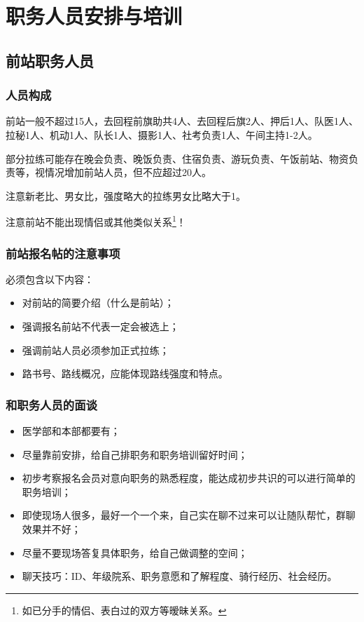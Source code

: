\documentclass[UTF8]{ctexart}
\begin{document}
\section{职务人员安排与培训}

\subsection{前站职务人员}

\subsubsection{人员构成}

前站一般不超过15人，去回程前旗助共4人、去回程后旗2人、押后1人、队医1人、拉秘1人、机动1人、队长1人、摄影1人、社考负责1人、午间主持1-2人。

部分拉练可能存在晚会负责、晚饭负责、住宿负责、游玩负责、午饭前站、物资负责等，视情况增加前站人员，但不应超过20人。

注意新老比、男女比，强度略大的拉练男女比略大于1。

注意前站{\color{red}不能出现情侣或其他类似关系}\footnote{如已分手的情侣、表白过的双方等暧昧关系。}！

\subsubsection{前站报名帖的注意事项}

必须包含以下内容：
\begin{itemize}[nosep,left=4em]
    \item 对前站的简要介绍（什么是前站）；
    \item 强调报名前站不代表一定会被选上；
    \item 强调前站人员必须参加正式拉练；
    \item 路书号、路线概况，应能体现路线强度和特点。
\end{itemize}

\subsubsection{和职务人员的面谈}

\begin{itemize}[nosep,left=2em]
    \item 医学部和本部都要有；
    \item 尽量靠前安排，给自己排职务和职务培训留好时间；
    \item 初步考察报名会员对意向职务的熟悉程度，能达成初步共识的可以进行简单的职务培训；
    \item 即使现场人很多，最好一个一个来，自己实在聊不过来可以让随队帮忙，群聊效果并不好；
    \item 尽量不要现场答复具体职务，给自己做调整的空间；
    \item 聊天技巧：ID、年级院系、职务意愿和了解程度、骑行经历、社会经历。
\end{itemize}
\end{document}
